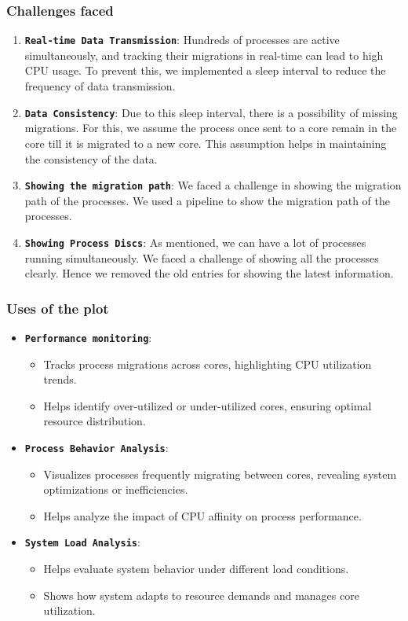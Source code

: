 \documentclass[12pt]{article}
\begin{document}
\subsubsection{Challenges faced}
\begin{enumerate}
    \item \textbf{\texttt{Real-time Data Transmission}}: Hundreds of processes are active simultaneously, and tracking their migrations in real-time can lead to high CPU usage. To prevent this, we implemented a sleep interval to reduce the frequency of data transmission.
    \item \textbf{\texttt{Data Consistency}}: Due to this sleep interval, there is a possibility of missing migrations. For this, we assume the process once sent to a core remain in the core till it is migrated to a new core. This assumption helps in maintaining the consistency of the data.
    \item \textbf{\texttt{Showing the migration path}}: We faced a challenge in showing the migration path of the processes. We used a pipeline to show the migration path of the processes.
    \item \textbf{\texttt{Showing Process Discs}}: As mentioned, we can have a lot of processes running simultaneously. We faced a challenge of showing all the processes clearly. Hence we removed the old entries for showing the latest information.
\end{enumerate}
\subsubsection{Uses of the plot}
\begin{itemize}
    \item \textbf{\texttt{Performance monitoring}}:
      \begin{itemize}
          \item Tracks process migrations across cores, highlighting CPU utilization trends.
          \item Helps identify over-utilized or under-utilized cores, ensuring optimal resource distribution.
      \end{itemize}
    \item \textbf{\texttt{Process Behavior Analysis}}:
      \begin{itemize}
          \item Visualizes processes frequently migrating between cores, revealing system optimizations or inefficiencies.
          \item Helps analyze the impact of CPU affinity on process performance.
      \end{itemize}
      \item \textbf{\texttt{System Load Analysis}}:
      \begin{itemize}
          \item Helps evaluate system behavior under different load conditions.
          \item Shows how system adapts to resource demands and manages core utilization.
      \end{itemize}
  \end{itemize}
\end{document}
